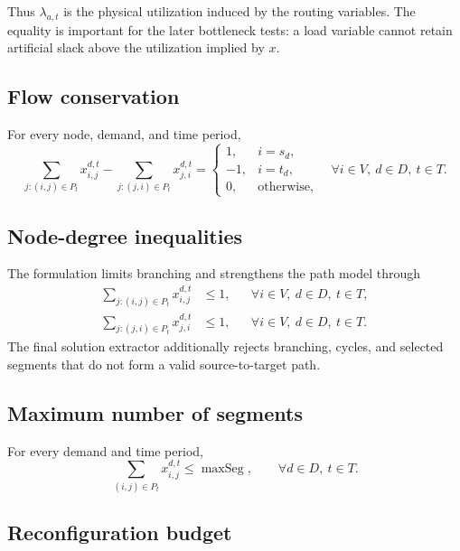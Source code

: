 \documentclass[11pt,a4paper]{article}
\newcommand{\maxSeg}{\operatorname{maxSeg}}
\begin{document}
Thus $\lambda_{a,t}$ is the physical utilization induced by the routing
variables. The equality is important for the later bottleneck tests: a load
variable cannot retain artificial slack above the utilization implied by $x$.

\subsection{Flow conservation}

For every node, demand, and time period,
\begin{equation}
\sum_{j:(i,j)\in P_t}x_{i,j}^{d,t}
-
\sum_{j:(j,i)\in P_t}x_{j,i}^{d,t}
=
\begin{cases}
1, & i=s_d,\\
-1, & i=t_d,\\
0, & \text{otherwise},
\end{cases}
\quad
\forall i\in V,\ d\in D,\ t\in T.
\tag{2}
\end{equation}

\subsection{Node-degree inequalities}

The formulation limits branching and strengthens the path model through
\begin{align}
\sum_{j:(i,j)\in P_t}x_{i,j}^{d,t}&\leq1,
&&\forall i\in V,\ d\in D,\ t\in T, \tag{3a}\\
\sum_{j:(j,i)\in P_t}x_{j,i}^{d,t}&\leq1,
&&\forall i\in V,\ d\in D,\ t\in T. \tag{3b}
\end{align}
The final solution extractor additionally rejects branching, cycles, and
selected segments that do not form a valid source-to-target path.

\subsection{Maximum number of segments}

For every demand and time period,
\begin{equation}
\sum_{(i,j)\in P_t}x_{i,j}^{d,t}
\leq \maxSeg,
\qquad \forall d\in D,\ t\in T.
\tag{4}
\end{equation}

\subsection{Reconfiguration budget}
\end{document}
